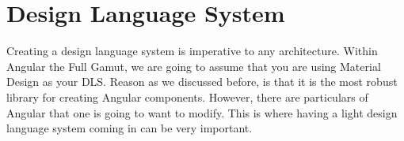 \maketitle{}
\section{ Design Language System }

Creating a design language system is imperative to any architecture. Within
Angular the Full Gamut, we are going to assume that you are using Material
Design as your DLS. Reason as we discussed before, is that it is the most robust
library for creating Angular components. However, there are particulars of
Angular that one is going to want to modify. This is where having a light
design language system coming in can be very important.
